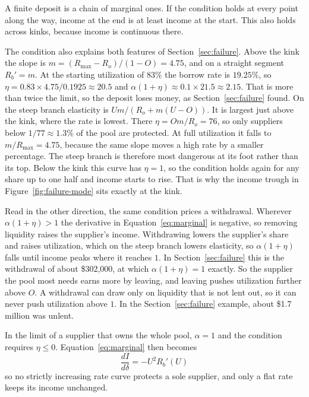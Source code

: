 \documentclass[11pt,a4paper]{article}
\begin{document}
A finite deposit is a chain of marginal ones. If the condition holds at every point along the way, income at the end is at least income at the start. This also holds across kinks, because income is continuous there.

The condition also explains both features of Section~\ref{sec:failure}. Above the kink the slope is $m=(R_{\max}-R_o)/(1-O)=4.75$, and on a straight segment $R_b'=m$. At the starting utilization of $83\%$ the borrow rate is $19.25\%$, so $\eta=0.83\times4.75/0.1925\approx20.5$ and $\alpha(1+\eta)\approx0.1\times21.5\approx2.15$. That is more than twice the limit, so the deposit loses money, as Section~\ref{sec:failure} found. On the steep branch elasticity is $Um/(R_o+m(U-O))$. It is largest just above the kink, where the rate is lowest. There $\eta=Om/R_o=76$, so only suppliers below $1/77\approx1.3\%$ of the pool are protected. At full utilization it falls to $m/R_{\max}=4.75$, because the same slope moves a high rate by a smaller percentage. The steep branch is therefore most dangerous at its foot rather than its top. Below the kink this curve has $\eta=1$, so the condition holds again for any share up to one half and income starts to rise. That is why the income trough in Figure~\ref{fig:failure-mode} sits exactly at the kink.

Read in the other direction, the same condition prices a withdrawal. Wherever $\alpha(1+\eta)>1$ the derivative in Equation~\ref{eq:marginal} is negative, so removing liquidity raises the supplier's income. Withdrawing lowers the supplier's share and raises utilization, which on the steep branch lowers elasticity, so $\alpha(1+\eta)$ falls until income peaks where it reaches $1$. In Section~\ref{sec:failure} this is the withdrawal of about \$302{,}000, at which $\alpha(1+\eta)=1$ exactly. So the supplier the pool most needs earns more by leaving, and leaving pushes utilization further above $O$. A withdrawal can draw only on liquidity that is not lent out, so it can never push utilization above $1$. In the Section~\ref{sec:failure} example, about \$1.7 million was unlent.

In the limit of a supplier that owns the whole pool, $\alpha=1$ and the condition requires $\eta\leq0$. Equation~\ref{eq:marginal} then becomes
\begin{equation}
\frac{dI}{d\delta}=-U^2R_b'(U)
\end{equation}
so no strictly increasing rate curve protects a sole supplier, and only a flat rate keeps its income unchanged.
\end{document}
